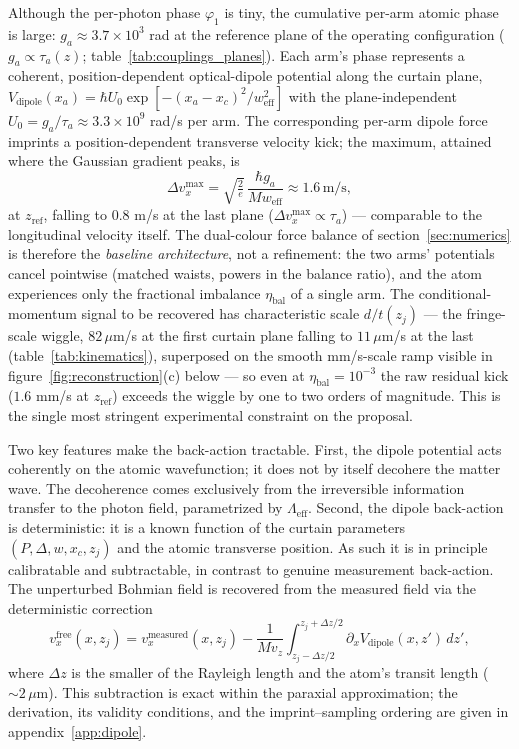 \documentclass[11pt,a4paper]{article}
\begin{document}
Although the per-photon phase $\varphi_1$ is tiny, the cumulative per-arm atomic phase is large: $g_a \approx 3.7\times 10^3$ rad at the reference plane of the operating configuration ($g_a \propto \tau_a(z)$; table~\ref{tab:couplings_planes}). Each arm's phase represents a coherent, position-dependent optical-dipole potential along the curtain plane, $V_\text{dipole}(x_a) = \hbar U_0 \exp[-(x_a-x_c)^2/w_\text{eff}^2]$ with the plane-independent $U_0 = g_a/\tau_a \approx 3.3\times 10^9$ rad/s per arm. The corresponding per-arm dipole force imprints a position-dependent transverse velocity kick; the maximum, attained where the Gaussian gradient peaks, is
\begin{equation}
\Delta v_x^\text{max} = \sqrt{\tfrac{2}{e}}\,\frac{\hbar g_a}{Mw_\text{eff}} \approx 1.6\,\text{m/s},
\label{eq:dipole_kick_max}
\end{equation}
at $z_\text{ref}$, falling to $0.8$ m/s at the last plane ($\Delta v_x^\text{max} \propto \tau_a$) --- comparable to the longitudinal velocity itself. The dual-colour force balance of section~\ref{sec:numerics} is therefore the \emph{baseline architecture}, not a refinement: the two arms' potentials cancel pointwise (matched waists, powers in the balance ratio), and the atom experiences only the fractional imbalance $\eta_\text{bal}$ of a single arm. The conditional-momentum signal to be recovered has characteristic scale $d/t(z_j)$ --- the fringe-scale wiggle, $82\,\mu$m/s at the first curtain plane falling to $11\,\mu$m/s at the last (table~\ref{tab:kinematics}), superposed on the smooth mm/s-scale ramp visible in figure~\ref{fig:reconstruction}(c) below --- so even at $\eta_\text{bal} = 10^{-3}$ the raw residual kick ($1.6$ mm/s at $z_\text{ref}$) exceeds the wiggle by one to two orders of magnitude. This is the single most stringent experimental constraint on the proposal.

Two key features make the back-action tractable. First, the dipole potential acts coherently on the atomic wavefunction; it does not by itself decohere the matter wave. The decoherence comes exclusively from the irreversible information transfer to the photon field, parametrized by $\Lambda_\text{eff}$. Second, the dipole back-action is deterministic: it is a known function of the curtain parameters $(P, \Delta, w, x_c, z_j)$ and the atomic transverse position. As such it is in principle calibratable and subtractable, in contrast to genuine measurement back-action. The unperturbed Bohmian field is recovered from the measured field via the deterministic correction
\begin{equation}
v_x^\text{free}(x, z_j) = v_x^\text{measured}(x, z_j) - \frac{1}{Mv_z}\int_{z_j-\Delta z/2}^{z_j+\Delta z/2}\partial_x V_\text{dipole}(x, z')\,dz',
\label{eq:dipole_subtraction}
\end{equation}
where $\Delta z$ is the smaller of the Rayleigh length and the atom's transit length ($\sim 2\,\mu$m). This subtraction is exact within the paraxial approximation; the derivation, its validity conditions, and the imprint--sampling ordering are given in appendix~\ref{app:dipole}.
\end{document}
